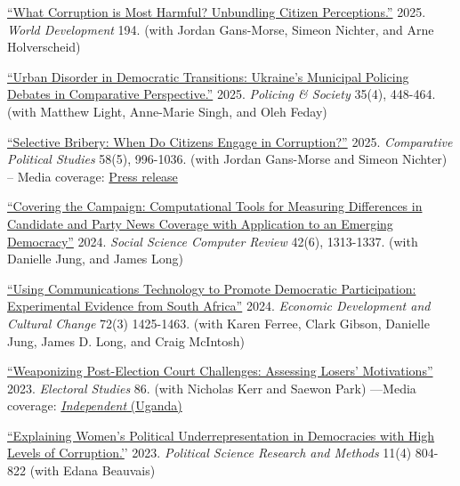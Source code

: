 \documentclass[margin,line]{res}
\begin{document}
\begin{etaremune}
{   \item \href{https://doi.org/10.1016/j.worlddev.2025.107001}{``What Corruption is Most Harmful? Unbundling Citizen Perceptions.''} 2025. \textit{ World Development} 194. (with Jordan Gans-Morse, Simeon Nichter, and Arne Holverscheid)

  \item \href{https://doi.org/10.1080/10439463.2024.2411538}{``Urban Disorder in Democratic Transitions: Ukraine's Municipal Policing Debates in Comparative Perspective.''} 2025. \textit{Policing \& Society} 35(4), 448-464. (with Matthew Light, Anne-Marie Singh, and Oleh Feday)

  \item \href{https://doi.org/10.1177/0010414024125944}{``Selective Bribery: When Do Citizens Engage in Corruption?''} 2025. \textit{Comparative Political Studies} 58(5), 996-1036. (with Jordan Gans-Morse and Simeon Nichter) \\
  -- Media coverage: \href{https://www.mcgill.ca/channels/channels/news/understanding-when-and-why-people-give-bribes-361998}{Press release}

\item \href{https://journals.sagepub.com/doi/10.1177/08944393241247420}{``Covering the Campaign: Computational Tools for Measuring Differences in Candidate and Party News Coverage with Application to an Emerging Democracy''} 2024. \textit{Social Science Computer Review} 42(6), 1313-1337. (with Danielle Jung, and James Long)

  \item \href{https://www.journals.uchicago.edu/doi/10.1086/724010}{``Using Communications Technology to Promote Democratic Participation: Experimental Evidence from South Africa''} 2024. \textit{Economic Development and Cultural Change} 72(3) 1425-1463. (with Karen Ferree, Clark Gibson, Danielle Jung, James D. Long, and Craig McIntosh)

  \item \href{https://doi.org/10.1016/j.electstud.2023.102676}{``Weaponizing Post-Election Court Challenges: Assessing Losers' Motivations''} 2023. \textit{Electoral Studies} 86. (with Nicholas Kerr and Saewon Park) \newline
  ---Media coverage: \href{https://web.archive.org/web/20220516083222/https://www.independent.co.ug/court-cant-reverse-museveni-election-win/}{\textit{Independent} (Uganda)}

  \item \href{https://www.cambridge.org/core/journals/political-science-research-and-methods/article/explaining-womens-political-underrepresentation-in-democracies-with-high-levels-of-corruption/EF67ADDE49FCD57030BFF6F53950334A}{``Explaining Women's Political Underrepresentation in Democracies with High Levels of Corruption.'}' 2023. \textit{Political Science Research and Methods}  11(4) 804-822 (with Edana Beauvais)

}
\end{etaremune}
\end{document}
